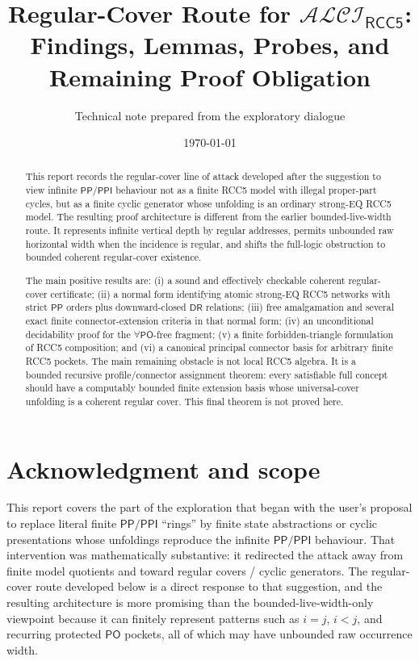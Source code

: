 \documentclass[11pt]{article}
\title{Regular-Cover Route for $\mathcal{ALCI}_{\mathsf{RCC5}}$:\\Findings, Lemmas, Probes, and Remaining Proof Obligation}
\author{Technical note prepared from the exploratory dialogue}
\date{\today}
\newcommand{\PP}{\mathsf{PP}}
\newcommand{\PPI}{\mathsf{PPI}}
\newcommand{\PO}{\mathsf{PO}}
\newcommand{\DR}{\mathsf{DR}}
\begin{document}
\maketitle

\begin{abstract}
This report records the regular-cover line of attack developed after the suggestion to view infinite $\PP/\PPI$ behaviour not as a finite RCC5 model with illegal proper-part cycles, but as a finite cyclic generator whose unfolding is an ordinary strong-EQ RCC5 model.  The resulting proof architecture is different from the earlier bounded-live-width route.  It represents infinite vertical depth by regular addresses, permits unbounded raw horizontal width when the incidence is regular, and shifts the full-logic obstruction to bounded coherent regular-cover existence.

The main positive results are: (i) a sound and effectively checkable coherent regular-cover certificate; (ii) a normal form identifying atomic strong-EQ RCC5 networks with strict $\PP$ orders plus downward-closed $\DR$ relations; (iii) free amalgamation and several exact finite connector-extension criteria in that normal form; (iv) an unconditional decidability proof for the $\forall\PO$-free fragment; (v) a finite forbidden-triangle formulation of RCC5 composition; and (vi) a canonical principal connector basis for arbitrary finite RCC5 pockets.  The main remaining obstacle is not local RCC5 algebra.  It is a bounded recursive profile/connector assignment theorem: every satisfiable full concept should have a computably bounded finite extension basis whose universal-cover unfolding is a coherent regular cover.  This final theorem is not proved here.
\end{abstract}

\tableofcontents
\newpage

\section*{Acknowledgment and scope}
This report covers the part of the exploration that began with the user's proposal to replace literal finite $\PP/\PPI$ ``rings'' by finite state abstractions or cyclic presentations whose unfoldings reproduce the infinite $\PP/\PPI$ behaviour.  That intervention was mathematically substantive: it redirected the attack away from finite model quotients and toward regular covers / cyclic generators.  The regular-cover route developed below is a direct response to that suggestion, and the resulting architecture is more promising than the bounded-live-width-only viewpoint because it can finitely represent patterns such as $i=j$, $i<j$, and recurring protected $\PO$ pockets, all of which may have unbounded raw occurrence width.
\end{document}
